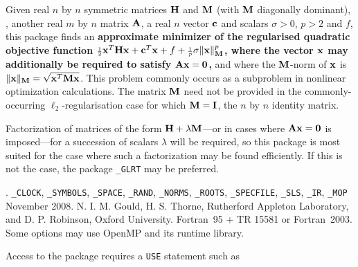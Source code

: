 \documentclass{galahad}
\newcommand{\packagename}{RQS}
\newcommand{\fullpackagename}{\libraryname\_\packagename}
\begin{document}
\galheader


\galsummary
Given real $n$ by $n$ symmetric matrices ${\mathbf{H}}$ and ${\mathbf{M}}$
(with ${\mathbf{M}}$ diagonally dominant), , another real $m$ by $n$ matrix ${\mathbf{A}}$,
a real $n$ vector ${\mathbf{c}}$ and scalars $\sigma>0$, $p>2$ and $f$, this package
finds an {\bf approximate minimizer of the regularised quadratic objective
function
${\scriptstyle \frac{1}{2}} {\mathbf{x}}^T {\mathbf{H}} {\mathbf{x}}  +  {\mathbf{c}}^T {\mathbf{x}} + f
 + {\scriptstyle \frac{1}{p}} \sigma \|{\mathbf{x}}\|_{{\mathbf{M}}}^p$,
where the vector ${\mathbf{x}}$ may additionally be required to satisfy
${\mathbf{A}} {\mathbf{x}} = {\mathbf{0}}$,} and
where the ${\mathbf{M}}$-norm of ${\mathbf{x}}$ is $\|{\mathbf{x}}\|_{{\mathbf{M}}} = \sqrt{{\mathbf{x}}^T {\mathbf{M}} {\mathbf{x}}}$.
This problem commonly occurs as a subproblem in nonlinear
optimization calculations.
The matrix ${\mathbf{M}}$ need not be provided in the commonly-occurring
$\ell_2$-regularisation case for which ${\mathbf{M}} = {\mathbf{I}}$, the $n$ by $n$
identity matrix.

\noindent
Factorization of matrices of the form ${\mathbf{H}} + \lambda {\mathbf{M}}$---or
in cases where ${\mathbf{A}} {\mathbf{x}} = {\mathbf{0}}$ is imposed---for a succession
of scalars $\lambda$ will be required, so this package is most suited
for the case where such a factorization may be found efficiently. If
this is not the case, the package {\tt \libraryname\_GLRT} may be preferred.



\galattributes
\galversions{\tt  \fullpackagename\_single, \fullpackagename\_double}.
\galuses
{\tt \libraryname\_CLOCK},
{\tt \libraryname\_SY\-M\-BOLS},
{\tt \libraryname\_SPACE}, {\tt \libraryname\_\-RAND},
{\tt \libraryname\_\-NORMS},
{\tt \libraryname\_ROOTS}, {\tt \libraryname\_SPECFILE},
{\tt \libraryname\_SLS}, {\tt \libraryname\_IR},
{\tt \libraryname\_MOP}
\galdate November 2008.
\galorigin N. I. M. Gould, H. S. Thorne, Rutherford Appleton Laboratory,
and D. P. Robinson, Oxford University.
\gallanguage Fortran~95 + TR 15581 or Fortran~2003.
\galparallelism Some options may use OpenMP and its runtime library.


\galhowto

Access to the package requires a {\tt USE} statement such as

\medskip{}
\end{document}
